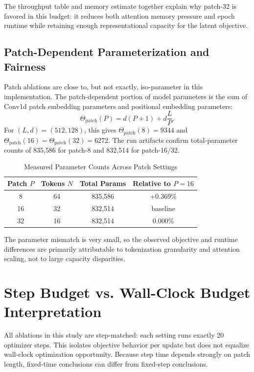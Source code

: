 \documentclass[conference]{IEEEtran}
\begin{document}
The throughput table and memory estimate together explain why patch-32 is favored in this budget: it reduces both attention memory pressure and epoch runtime while retaining enough representational capacity for the latent objective.

\subsection{Patch-Dependent Parameterization and Fairness}
Patch ablations are close to, but not exactly, iso-parameter in this implementation. The patch-dependent portion of model parameters is the sum of Conv1d patch embedding parameters and positional embedding parameters:
\begin{equation}
\Theta_{\text{patch}}(P) = d(P+1) + d\frac{L}{P}.
\label{eq:patch_params}
\end{equation}
For $(L,d)=(512,128)$, this gives $\Theta_{\text{patch}}(8)=9344$ and $\Theta_{\text{patch}}(16)=\Theta_{\text{patch}}(32)=6272$. The run artifacts confirm total-parameter counts of 835{,}586 for patch-8 and 832{,}514 for patch-16/32.

\begin{table}[t]
\caption{Measured Parameter Counts Across Patch Settings}
\label{tab:param_count}
\centering
\begin{tabular}{cccc}
\toprule
Patch $P$ & Tokens $N$ & Total Params & Relative to $P=16$ \\
\midrule
8  & 64 & 835{,}586 & +0.369\% \\
16 & 32 & 832{,}514 & baseline \\
32 & 16 & 832{,}514 & 0.000\% \\
\bottomrule
\end{tabular}
\end{table}

The parameter mismatch is very small, so the observed objective and runtime differences are primarily attributable to tokenization granularity and attention scaling, not to large capacity disparities.

\section{Step Budget vs. Wall-Clock Budget Interpretation}
All ablations in this study are step-matched: each setting runs exactly 20 optimizer steps. This isolates objective behavior per update but does not equalize wall-clock optimization opportunity. Because step time depends strongly on patch length, fixed-time conclusions can differ from fixed-step conclusions.
\end{document}
